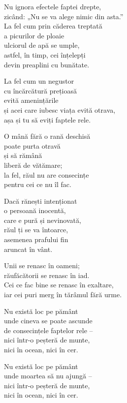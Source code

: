 Nu ignora efectele faptei drepte,\\
zicând: „Nu se va alege nimic din asta.”\\
La fel cum prin căderea treptată\\
a picurilor de ploaie\\
ulciorul de apă se umple,\\
astfel, în timp, cei înțelepți\\
devin preaplini cu bunătate.


La fel cum un negustor\\
cu încărcătură prețioasă\\
evită amenințările\\
și acei care iubesc viața evită otrava,\\
așa și tu să eviți faptele rele.


O mână fără o rană deschisă\\
poate purta otravă\\
și să rămână \\
liberă de vătămare;\\
la fel, răul nu are consecințe\\
pentru cei ce nu îl fac.


Dacă rănești intenționat\\
o persoană inocentă,\\
care e pură și nevinovată,\\
răul ți se va întoarce,\\
asemenea prafului fin\\
aruncat în vânt.


Unii se renasc în oameni;\\
răufăcătorii se renasc în iad.\\
Cei ce fac bine se renasc în exaltare,\\
iar cei puri merg în tărâmul fără urme.


Nu există loc pe pământ\\
unde cineva se poate ascunde\\
de consecințele faptelor rele –\\
nici într-o peșteră de munte,\\
nici în ocean, nici în cer.


Nu există loc pe pământ\\
unde moartea să nu ajungă –\\
nici într-o peșteră de munte,\\
nici în ocean, nici în cer.

